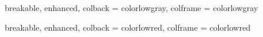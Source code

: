 

{
  breakable,
  enhanced,
  colback  = colorlowgray,
  colframe = colorlowgray
}


{
  breakable,
  enhanced,
  colback  = colorlowred,
  colframe = colorlowred
}


